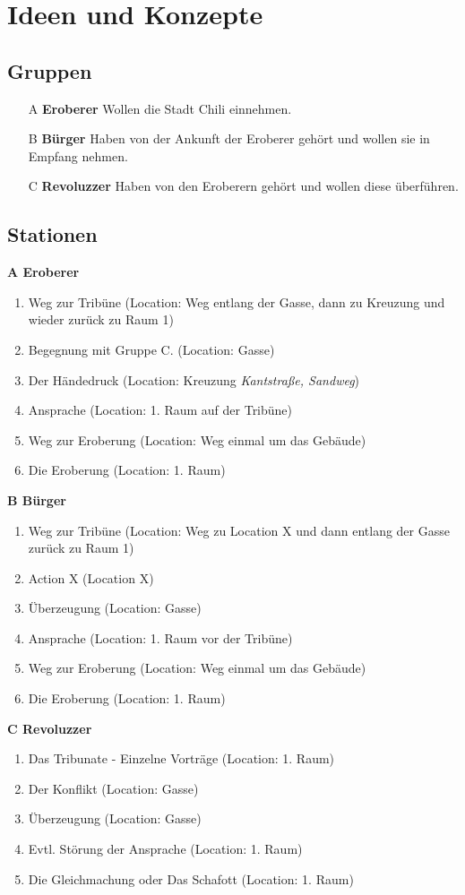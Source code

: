 \documentclass[a4paper, 12pt]{report}
\newcommand\backmatter{ \cleardoublepage \pagenumbering{roman}}
\begin{document}
\backmatter

\chapter* {Ideen und Konzepte}\label{ideen_konzepte}
\section*{Gruppen}
\begin{itemize}
    \item[A] \textbf{Eroberer} Wollen die Stadt Chili einnehmen.
    \item[B] \textbf{Bürger} Haben von der Ankunft der Eroberer gehört und wollen sie in Empfang nehmen.
    \item[C] \textbf{Revoluzzer} Haben von den Eroberern gehört und wollen diese überführen.
\end{itemize}

\section*{Stationen}
\textbf{A Eroberer}
\begin{enumerate}
    \item Weg zur Tribüne (Location: Weg entlang der Gasse, dann zu Kreuzung und wieder zurück zu Raum 1)
    \item Begegnung mit Gruppe C. (Location: Gasse)
    \item Der Händedruck (Location: Kreuzung \textit{Kantstraße, Sandweg})
    \item Ansprache (Location: 1. Raum auf der Tribüne)
    \item Weg zur Eroberung (Location: Weg einmal um das Gebäude)
    \item Die Eroberung (Location: 1. Raum)
\end{enumerate}
\textbf{B Bürger}
\begin{enumerate}
    \item Weg zur Tribüne (Location: Weg zu Location X und dann entlang der Gasse zurück zu Raum 1)
    \item Action X (Location X)
    \item Überzeugung (Location: Gasse)
    \item Ansprache (Location: 1. Raum vor der Tribüne)
    \item Weg zur Eroberung (Location: Weg einmal um das Gebäude)
    \item Die Eroberung (Location: 1. Raum)
\end{enumerate}
\textbf{C Revoluzzer}
\begin{enumerate}
    \item Das Tribunate - Einzelne Vorträge (Location: 1. Raum)
    \item Der Konflikt (Location: Gasse)
    \item Überzeugung (Location: Gasse)
    \item Evtl. Störung der Ansprache (Location: 1. Raum)
    \item Die Gleichmachung oder Das Schafott  (Location: 1. Raum)
\end{enumerate}
\end{document}
